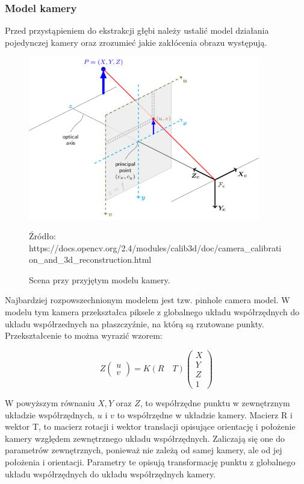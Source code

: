 \documentclass[oneside, eng]{mgr}
\begin{document}
\subsubsection{Model kamery}
Przed przystąpieniem do ekstrakcji głębi należy ustalić model działania pojedynczej kamery oraz zrozumieć jakie zakłócenia obrazu występują.

\begin{figure}
\centering
	\includegraphics[width=0.90\textwidth]{pinhole_camera_model.png}\par\vspace{1cm}
\caption{Scena przy przyjętym modelu kamery.}
Źródło: https://docs.opencv.org/2.4/modules/calib3d/doc/camera\_calibration\_and\_3d\_reconstruction.html
	\label{fig:camera_model}
\end{figure}

Najbardziej rozpowszechnionym modelem jest tzw. pinhole camera model. W modelu tym kamera przekształca piksele z globalnego układu współrzędnych do układu współrzednych na płaszczyźnie, na którą są rzutowane punkty. Przekształcenie to można wyrazić wzorem:

\begin{equation}
	Z
	\left( \begin{array}{l}
		u \\
		v 
	\end{array} \right) 
	= K (R \quad T) 
	\left( \begin{array}{l}
		X \\	Y \\	Z \\	1
	\end{array} \right) 
\end{equation}

W powyższym równaniu $X, Y$ oraz $Z$, to współrzędne punktu w zewnętrznym układzie współrzędnych,
$u$ i $v$ to współrzędne w układzie kamery.
Macierz R i wektor T, to macierz rotacji i wektor translacji opisujące orientację i położenie kamery względem zewnętrznego układu współrzędnych. Zaliczają się one do parametrów zewnętrznych, ponieważ nie zależą od samej kamery, ale od jej położenia i orientacji. Parametry te opisują transformację punktu z globalnego układu współrzędnych do układu współrzędnych kamery. 
\end{document}
